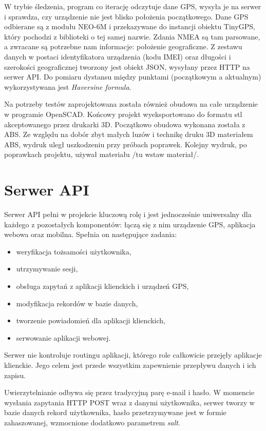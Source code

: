 \documentclass[eng,printmode]{mgr}
\begin{document}
W trybie śledzenia, program co iterację odczytuje dane GPS, wysyła je na serwer i sprawdza, czy urządzenie nie jest blisko położenia początkowego. Dane GPS odbierane są z modułu NEO-6M i przekazywane do instancji obiektu TinyGPS, który pochodzi z biblioteki o tej samej nazwie. Zdania NMEA są tam parsowane, a zwracane są potrzebne nam informacje: położenie geograficzne. Z zestawu danych w postaci identyfikatora urządzenia (kodu IMEI) oraz długości i szerokości geograficznej tworzony jest obiekt JSON, wysyłany przez HTTP na serwer API. Do pomiaru dystansu między punktami (początkowym a aktualnym) wykorzystywana jest \textit{Haversine formula}\cite{haversine}. 

Na potrzeby testów zaprojektowana została również obudowa na całe urządzenie w programie OpenSCAD. Końcowy projekt wyeksportowano do formatu stl akceptowanego przez drukarki 3D. Początkowo obudowa wykonana została z ABS. Ze względu na dobór zbyt małych luzów i technikę druku 3D materiałem ABS, wydruk uległ uszkodzeniu przy próbach poprawek. Kolejny wydruk, po poprawkach projektu, używał materiału /tu wstaw materiał/.



\section{Serwer API}
Serwer API pełni w projekcie kluczową rolę i jest jednocześnie uniwersalny dla każdego z pozostałych komponentów: łączą się z nim urządzenie GPS, aplikacja webowa oraz mobilna. Spełnia on następujące zadania:
\begin{itemize}
\item weryfikacja tożsamości użytkownika,
\item utrzymywanie sesji,
\item obsługa zapytań z aplikacji klienckich i urządzeń GPS,
\item modyfikacja rekordów w bazie danych,
\item tworzenie powiadomień dla aplikacji klienckich,
\item serwowanie aplikacji webowej.
\end{itemize}
Serwer nie kontroluje routingu aplikacji, którego role całkowicie przejęły aplikacje klienckie. Jego celem jest przede wszystkim zapewnienie przepływu danych i ich zapisu.

Uwierzytelnianie odbywa się przez tradycyjną parę e-mail i hasło. W momencie wysłania zapytania HTTP POST wraz z danymi użytkownika, serwer tworzy w bazie danych rekord użytkownika, hasło przetrzymywane jest w formie zahaszowanej, wzmocnione dodatkowo parametrem \textit{salt}.
\end{document}
